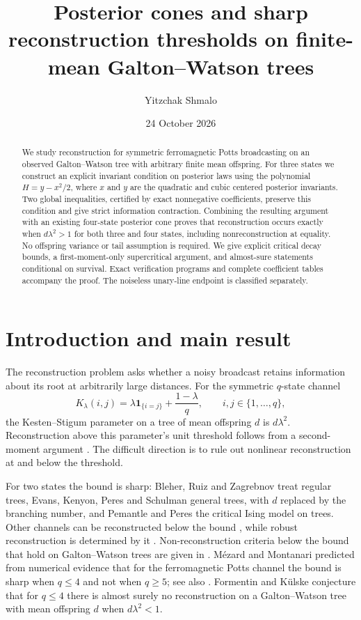 \documentclass[11pt,reqno]{amsart}
\title[Posterior cones and reconstruction]{Posterior cones and sharp reconstruction thresholds on finite-mean Galton--Watson trees}
\author{Yitzchak Shmalo}
\date{24 October 2026}
\theoremstyle{definition}
\theoremstyle{remark}
\newcommand{\ind}{\mathbf 1}
\begin{document}
\begin{abstract}
We study reconstruction for symmetric ferromagnetic Potts broadcasting on an observed Galton--Watson tree with arbitrary finite mean offspring. For three states we construct an explicit invariant condition on posterior laws using the polynomial $H=y-x^2/2$, where $x$ and $y$ are the quadratic and cubic centered posterior invariants. Two global inequalities, certified by exact nonnegative coefficients, preserve this condition and give strict information contraction. Combining the resulting argument with an existing four-state posterior cone proves that reconstruction occurs exactly when $d\lambda^2>1$ for both three and four states, including nonreconstruction at equality. No offspring variance or tail assumption is required. We give explicit critical decay bounds, a first-moment-only supercritical argument, and almost-sure statements conditional on survival. Exact verification programs and complete coefficient tables accompany the proof. The noiseless unary-line endpoint is classified separately.
\end{abstract}
\maketitle

\section{Introduction and main result}

The reconstruction problem asks whether a noisy broadcast retains information about its root at arbitrarily large distances. For the symmetric $q$-state channel
\begin{equation}\label{eq:channel}
 K_\lambda(i,j)=\lambda\ind_{\{i=j\}}+\frac{1-\lambda}{q},
 \qquad i,j\in\{1,\ldots,q\},
\end{equation}
the Kesten--Stigum parameter on a tree of mean offspring $d$ is $d\lambda^2$. Reconstruction above this parameter's unit threshold follows from a second-moment argument \cite{KS66,MP03}. The difficult direction is to rule out nonlinear reconstruction at and below the threshold.

For two states the bound is sharp: Bleher, Ruiz and Zagrebnov \cite{BRZ95} treat regular trees, Evans, Kenyon, Peres and Schulman \cite{EKPS00} general trees, with $d$ replaced by the branching number, and Pemantle and Peres \cite{PP10} the critical Ising model on trees. Other channels can be reconstructed below the bound \cite{Mos01}, while robust reconstruction is determined by it \cite{JM04}. Non-reconstruction criteria below the bound that hold on Galton--Watson trees are given in \cite{MP03,FK09b,GP23}. M\'ezard and Montanari \cite{MM06} predicted from numerical evidence that for the ferromagnetic Potts channel the bound is sharp when $q\le4$ and not when $q\ge5$; see also \cite{DKMZ11,RSZ19}. Formentin and K\"ulske \cite[Conjecture~2.13]{FK09a} conjecture that for $q\le4$ there is almost surely no reconstruction on a Galton--Watson tree with mean offspring $d$ when $d\lambda^2<1$.
\end{document}
